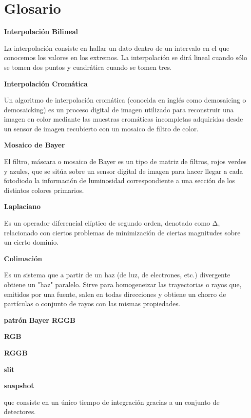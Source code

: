 \chapter{Glosario} %

\textbf{Interpolación Bilineal} 

La interpolación consiste en hallar un dato dentro de un intervalo en el que conocemos los valores en los extremos. La interpolación se dirá lineal cuando sólo se tomen dos puntos y cuadrática cuando se tomen tres.

\textbf{Interpolación Cromática} 

Un algoritmo de interpolación cromática (conocida en inglés como demosaicing o demosaicking) es un proceso digital de imagen utilizado para reconstruir una imagen en color mediante las muestras cromáticas incompletas adquiridas desde un sensor de imagen recubierto con un mosaico de filtro de color.

\textbf{Mosaico de Bayer} 

El filtro, máscara o mosaico de Bayer es un tipo de matriz de filtros, rojos verdes y azules, que se sitúa sobre un sensor digital de imagen para hacer llegar a cada fotodiodo la información de luminosidad correspondiente a una sección de los distintos colores primarios. 

\textbf{Laplaciano} 

 Es un operador diferencial elíptico de segundo orden, denotado como Δ, relacionado con ciertos problemas de minimización de ciertas magnitudes sobre un cierto dominio.

\textbf{Colimación} 

Es un sistema que a partir de un haz (de luz, de electrones, etc.) divergente obtiene un "haz" paralelo. Sirve para homogeneizar las trayectorias o rayos que, emitidos por una fuente, salen en todas direcciones y obtiene un chorro de partículas o conjunto de rayos con las mismas propiedades.

\textbf{patrón Bayer RGGB} 



\textbf{RGB} 

\textbf{RGGB} 

\textbf{slit} 

\textbf{snapshot} 

que consiste en un único tiempo de integración gracias a un conjunto de detectores. 

